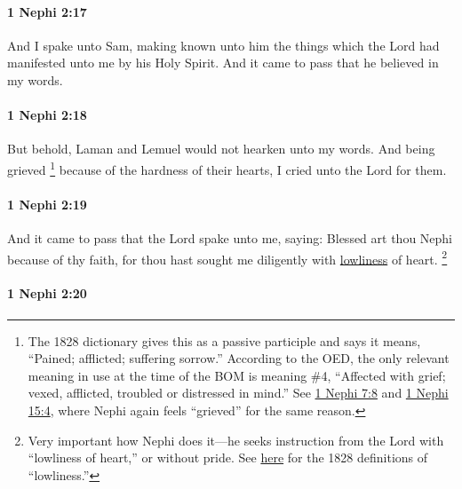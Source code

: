 		\paragraph{1 Nephi 2:17} %
			\label{1NEPHI-2-17}

			And I spake unto Sam, making known unto him the things
			which the Lord had manifested unto me by his Holy Spirit.
			And it came to pass that he believed in my words.

		\paragraph{1 Nephi 2:18} %
			\label{1NEPHI-2-18}

			But behold, Laman and Lemuel would not hearken unto my words.
			And being grieved%
				\footnote{%
					The 1828 dictionary gives this as a passive participle and says it means, ``Pained; afflicted; suffering sorrow.'' According to the OED, the only relevant meaning in use at the time of the BOM is meaning \#4, ``Affected with grief; vexed, afflicted, troubled or distressed in mind.'' See \hyperref[1NEPHI-7-8]{1 Nephi 7:8} and \hyperref[1NEPHI-15-4]{1 Nephi 15:4}, where Nephi again feels ``grieved'' for the same reason.
					}
			because of the hardness of their hearts,
			I cried unto the Lord for them.

		\paragraph{1 Nephi 2:19} %
			\label{1NEPHI-2-19}

			And it came to pass that the Lord spake unto me, saying:
			Blessed art thou Nephi because of thy faith,
			for thou hast sought me diligently with \hyperref[LOWLINESS-1828]{lowliness} of heart.%
				\footnote{%
					\label{1NEPHI-2-19-NOTE-lowliness}%
					Very important how Nephi does it---he seeks instruction from the Lord with ``lowliness of heart,'' or without pride. See \hyperref[LOWLINESS-1828]{here} for the 1828 definitions of ``lowliness.''
					}

		\paragraph{1 Nephi 2:20} %
			\label{1NEPHI-2-20}

